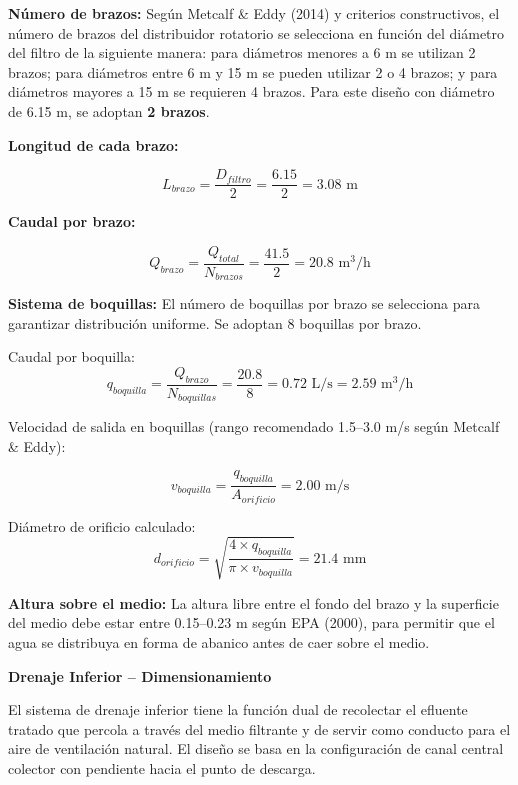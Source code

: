 \documentclass[12pt,a4paper]{article}
\begin{document}
\textbf{Número de brazos:} Según Metcalf \& Eddy (2014) y criterios constructivos, el número de brazos del distribuidor rotatorio se selecciona en función del diámetro del filtro de la siguiente manera: para diámetros menores a 6 m se utilizan 2 brazos; para diámetros entre 6 m y 15 m se pueden utilizar 2 o 4 brazos; y para diámetros mayores a 15 m se requieren 4 brazos. Para este diseño con diámetro de 6.15 m, se adoptan \textbf{2 brazos}.

\textbf{Longitud de cada brazo:}

\begin{equation}
L_{brazo} = \frac{D_{filtro}}{2} = \frac{6.15}{2} = 3.08 \text{ m}
\end{equation}

\textbf{Caudal por brazo:}

\begin{equation}
Q_{brazo} = \frac{Q_{total}}{N_{brazos}} = \frac{41.5}{2} = 20.8 \text{ m}^3\text{/h}
\end{equation}

\textbf{Sistema de boquillas:} El número de boquillas por brazo se selecciona para garantizar distribución uniforme. Se adoptan 8 boquillas por brazo.

Caudal por boquilla:
\begin{equation}
q_{boquilla} = \frac{Q_{brazo}}{N_{boquillas}} = \frac{20.8}{8} = 0.72 \text{ L/s} = 2.59 \text{ m}^3\text{/h}
\end{equation}

Velocidad de salida en boquillas (rango recomendado 1.5--3.0 m/s según Metcalf \& Eddy):

\begin{equation}
v_{boquilla} = \frac{q_{boquilla}}{A_{orificio}} = 2.00 \text{ m/s}
\end{equation}

Diámetro de orificio calculado:
\begin{equation}
d_{orificio} = \sqrt{\frac{4 \times q_{boquilla}}{\pi \times v_{boquilla}}} = 21.4 \text{ mm}
\end{equation}

\textbf{Altura sobre el medio:} La altura libre entre el fondo del brazo y la superficie del medio debe estar entre 0.15--0.23 m según EPA (2000), para permitir que el agua se distribuya en forma de abanico antes de caer sobre el medio.

\textbf{Drenaje Inferior -- Dimensionamiento}

El sistema de drenaje inferior tiene la función dual de recolectar el efluente tratado que percola a través del medio filtrante y de servir como conducto para el aire de ventilación natural. El diseño se basa en la configuración de canal central colector con pendiente hacia el punto de descarga.
\end{document}
